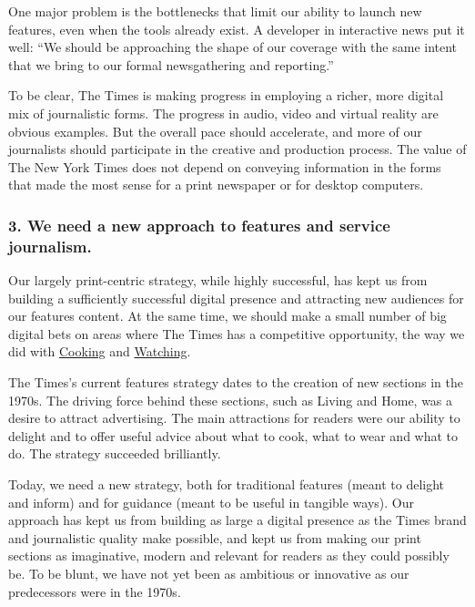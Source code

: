 One major problem is the bottlenecks that limit our ability to launch
new features, even when the tools already exist. A developer in
interactive news put it well: ``We should be approaching the shape of
our coverage with the same intent that we bring to our formal
newsgathering and reporting.''

To be clear, The Times is making progress in employing a richer, more
digital mix of journalistic forms. The progress in audio, video and
virtual reality are obvious examples. But the overall pace should
accelerate, and more of our journalists should participate in the
creative and production process. The value of The New York Times does
not depend on conveying information in the forms that made the most
sense for a print newspaper or for desktop computers.

\hypertarget{3-we-need-a-new-approach-to-features-and-service-journalism}{%
\subsubsection{3. We need a new approach to features and service
journalism.}\label{3-we-need-a-new-approach-to-features-and-service-journalism}}

Our largely print-centric strategy, while highly successful, has kept us
from building a sufficiently successful digital presence and attracting
new audiences for our features content. At the same time, we should make
a small number of big digital bets on areas where The Times has a
competitive opportunity, the way we did with
\href{http://cooking.nytimes.com/}{Cooking} and
\href{https://www.nytimes.com/watching}{Watching}.

The Times's current features strategy dates to the creation of new
sections in the 1970s. The driving force behind these sections, such as
Living and Home, was a desire to attract advertising. The main
attractions for readers were our ability to delight and to offer useful
advice about what to cook, what to wear and what to do. The strategy
succeeded brilliantly.

Today, we need a new strategy, both for traditional features (meant to
delight and inform) and for guidance (meant to be useful in tangible
ways). Our approach has kept us from building as large a digital
presence as the Times brand and journalistic quality make possible, and
kept us from making our print sections as imaginative, modern and
relevant for readers as they could possibly be. To be blunt, we have not
yet been as ambitious or innovative as our predecessors were in the
1970s.

